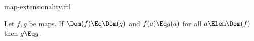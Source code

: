 \documentclass{stex}
\begin{document}
\begin{smodule}{map-extensionality.ftl}


\begin{fakeforthel}
  \begin{axiom*}
    Let $f,g$ be maps.
    If $\Dom(f) \Eq \Dom(g)$ and $f(a) \Eq g(a)$ for all $a \Elem \Dom(f)$ then $g \Eq g$.
  \end{axiom*}
\end{fakeforthel}

\end{smodule}
\end{document}
